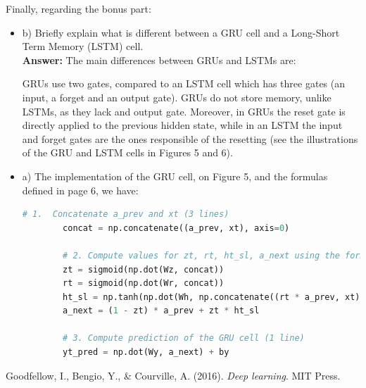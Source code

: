 \documentclass{article}
\begin{document}
Finally, regarding the bonus part:

\begin{itemize}
	\item b) Briefly explain what is different between a GRU cell and a Long-Short Term Memory (LSTM) cell. \\
	
	\textbf{Answer:} The main differences between GRUs and LSTMs are:
	
	GRUs use two gates, compared to an LSTM cell which has three gates (an input, a forget and an output gate). GRUs do not store memory, unlike LSTMs, as they lack and output gate. Moreover, in GRUs the reset gate is directly applied to the previous hidden state, while in an LSTM the input and forget gates are the ones responsible of the resetting (see the illustrations of the GRU and LSTM cells in Figures 5 and 6). \\
	
	\item a) The implementation of the GRU cell, on Figure 5, and the formulas defined in page 6, we have:
	
	\begin{lstlisting}[language=Python]
		# 1.  Concatenate a_prev and xt (3 lines)	
		concat = np.concatenate((a_prev, xt), axis=0)
		
		# 2. Compute values for zt, rt, ht_sl, a_next using the formulas given figure  (6 lines)	
		zt = sigmoid(np.dot(Wz, concat))
		rt = sigmoid(np.dot(Wr, concat))
		ht_sl = np.tanh(np.dot(Wh, np.concatenate((rt * a_prev, xt), axis=0)))
		a_next = (1 - zt) * a_prev + zt * ht_sl
		
		# 3. Compute prediction of the GRU cell (1 line)
		yt_pred = np.dot(Wy, a_next) + by\end{lstlisting}
	
\end{itemize}

\begin{thebibliography}{}
	 Goodfellow, I., Bengio, Y., \& Courville, A. (2016). \textit{Deep learning}. MIT Press.
\end{thebibliography}
\end{document}
